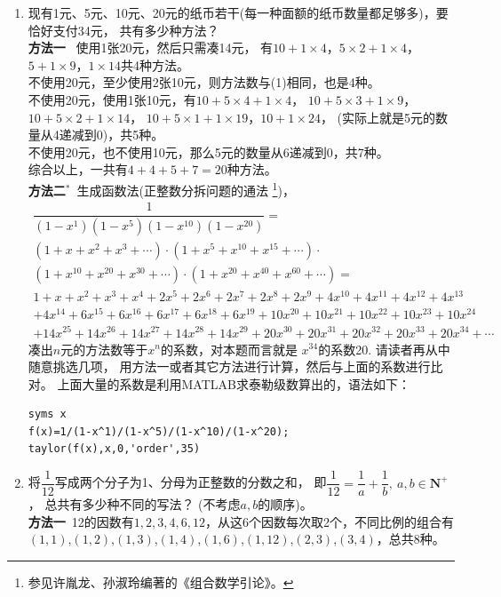 \begin{enumerate}[label={【\textbf{例\thechapter.\arabic*}】},
 leftmargin=\inteval{\myenumleftmargin}pt,
 itemsep=\inteval{\myenumitempsep}pt,
 itemindent=\inteval{\myenumitemindent}pt]
\item 现有1元、5元、10元、20元的纸币若干(每一种面额的纸币数量都足够多)，要恰好支付34元，
共有多少种方法？ \\
\textbf{方法一}\  使用1张20元，然后只需凑14元，
有$ 10+1\times 4 $，$ 5\times 2+
1\times 4 $，$ 5+1\times 9 $，$ 1\times 14 $共4种方法。\\
 不使用20元，至少使用2张10元，则方法数与(1)相同，也是4种。\\
 不使用20元，使用1张10元，有$ 10+5\times 4+1\times 4 $，
$ 10+5\times 3+1\times 9 $，$ 10+5\times 2+1\times 14 $，
$ 10+5\times 1+1\times 19 $，$ 10+1\times 24 $，
(实际上就是5元的数量从4递减到0)，共5种。\\
 不使用20元，也不使用10元，那么5元的数量从6递减到0，共7种。\\
综合以上，一共有$ 4+4+5+7=20 $种方法。\\
\textbf{方法二}$ ^* $\ 生成函数法(正整数分拆问题的通法
\footnote{参见许胤龙、孙淑玲编著的《组合数学引论》。})，
\begin{gather*}
    \dfrac{1}{(1-x^1)(1-x^5)(1-x^{10})(1-x^{20})}=\\
(1+x+x^2+x^3+\cdots)\cdot(1+x^5+x^{10}+x^{15}+\cdots)\cdot\\
(1+x^{10}+x^{20}+x^{30}+\cdots)\cdot(1+x^{20}+x^{40}+x^{60}+\cdots)=\\
1+x+x^{2}+x^{3}+x^{4}+2x^{5}+2x^{6}+2x^{7}+2x^{8}+2x^{9}+4x^{10}+4x^{11}+4x^{12}+4x^{13}\\
+4x^{14}+6x^{15}+6x^{16}+6x^{17}+6x^{18}+6x^{19}+10x^{20}+10x^{21}+10x^{22}+10x^{23}+10x^{24}\\
+14x^{25}+14x^{26}+14x^{27}+14x^{28}+14x^{29}+20x^{30}+20x^{31}+20x^{32}+20x^{33}+20x^{34}+\cdots
\end{gather*}
凑出$ n $元的方法数等于$ x^n $的系数，对本题而言就是
$ x^{34} $的系数20. 请读者再从中随意挑选几项，
用方法一或者其它方法进行计算，然后与上面的系数进行比对。
上面大量的系数是利用MATLAB求泰勒级数算出的，语法如下：
\begin{lstlisting}
syms x
f(x)=1/(1-x^1)/(1-x^5)/(1-x^10)/(1-x^20);
taylor(f(x),x,0,'order',35)    
\end{lstlisting} 
\bigskip 
\item 将$ \dfrac{1}{12} $写成两个分子为1、分母为正整数的分数之和，
即$ \dfrac{1}{12}=\dfrac{1}{a}+\dfrac{1}{b},\ a,b\in\textbf{N}^+ $，
总共有多少种不同的写法？
(不考虑$ a,b $的顺序)。\\
\textbf{方法一}\ 12的因数有$ 1,2,3,4,6,12 $，从这6个因数每次取2个，不同比例的组合有$ (1,1) $,$ (1,2) $,$ (1,3) $,$ (1,4) $,$ (1,6) $,$ (1,12) $,$ (2,3) $,$ (3,4) $，总共8种。

\end{enumerate}
